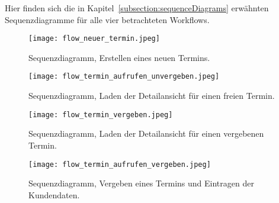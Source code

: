 Hier finden sich die in Kapitel~\ref{subsection:sequenceDiagrams} erwähnten Sequenzdiagramme für alle vier betrachteten Workflows.

\begin{figure}[H]
    \caption{Sequenzdiagramm, Erstellen eines neuen Termins.}
    \centering
    \texttt{[image: flow\_neuer\_termin.jpeg]}
\end{figure}

\begin{figure}[H]
    \caption{Sequenzdiagramm, Laden der Detailansicht für einen freien Termin.}
    \centering
    \texttt{[image: flow\_termin\_aufrufen\_unvergeben.jpeg]}
\end{figure}

\begin{figure}[H]
    \caption{Sequenzdiagramm, Laden der Detailansicht für einen vergebenen Termin.}
    \centering
    \texttt{[image: flow\_termin\_vergeben.jpeg]}
\end{figure}

\begin{figure}[H]
    \caption{Sequenzdiagramm, Vergeben eines Termins und Eintragen der Kundendaten.}
    \centering
    \texttt{[image: flow\_termin\_aufrufen\_vergeben.jpeg]}
\end{figure}

